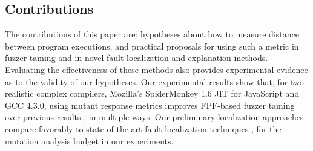 \subsection{Contributions}

The contributions of this paper are: hypotheses about how to measure distance between program executions, and practical proposals for using such a metric in fuzzer taming and in novel fault localization and explanation methods.  Evaluating the effectiveness of these methods also provides experimental evidence as to the validity of our hypotheses.  Our experimental results show that, for two realistic complex compilers, Mozilla's SpiderMonkey 1.6 JIT for JavaScript and GCC 4.3.0, using mutant response metrics improves FPF-based fuzzer taming over previous results \cite{PLDI13}, in multiple ways.  Our preliminary localization approaches compare favorably to state-of-the-art fault localization techniques \cite{MUSE,multilingual}, for the mutation analysis budget in our experiments.